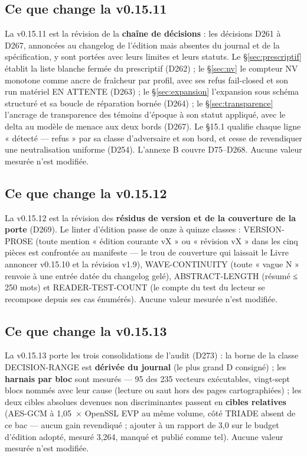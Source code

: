 \subsection{Ce que change la v0.15.11}\label{sec:nouveautes1511}

La v0.15.11 est la révision de la \textbf{chaîne de décisions} : les décisions D261 à D267,
annoncées au changelog de l'édition mais absentes du journal et de la spécification, y sont
portées avec leurs limites et leurs statuts. Le §\ref{sec:prescriptif} établit la liste
blanche fermée du prescriptif (D262) ; le §\ref{sec:nv} le compteur NV monotone comme ancre
de fraîcheur par profil, avec ses refus fail-closed et son run matériel EN ATTENTE (D263) ;
le §\ref{sec:expansion} l'expansion sous schéma structuré et sa boucle de réparation bornée
(D264) ; le §\ref{sec:transparence} l'ancrage de transparence des témoins d'époque à son
statut appliqué, avec le delta au modèle de menace aux deux bords (D267). Le §15.1 qualifie
chaque ligne « détecté — refus » par sa classe d'adversaire et son bord, et cesse de
revendiquer une neutralisation uniforme (D254). L'annexe B couvre D75--D268. Aucune valeur
mesurée n'est modifiée.


\subsection{Ce que change la v0.15.12}\label{sec:nouveautes1512}

La v0.15.12 est la révision des \textbf{résidus de version et de la couverture de la porte}
(D269). Le linter d'édition passe de onze à quinze classes : VERSION-PROSE (toute mention
« édition courante vX » ou « révision vX » dans les cinq pièces est confrontée au manifeste
— le trou de couverture qui laissait le Livre annoncer v0.15.10 et la révision v1.9),
WAVE-CONTINUITY (toute « vague N » renvoie à une entrée datée du changelog gelé),
ABSTRACT-LENGTH (résumé ≤ 250 mots) et READER-TEST-COUNT (le compte du test du lecteur se
recompose depuis ses cas énumérés). Aucune valeur mesurée n'est modifiée.


\subsection{Ce que change la v0.15.13}\label{sec:nouveautes1513}

La v0.15.13 porte les trois consolidations de l'audit (D273) : la borne de la classe
DECISION-RANGE est \textbf{dérivée du journal} (le plus grand D consigné) ; les \textbf{harnais
par bloc} sont mesurés — 95 des 235 vecteurs exécutables, vingt-sept blocs nommés avec leur
cause (lecture ou saut hors des pages cartographiées) ; les deux cibles absolues devenues non
discriminantes passent en \textbf{cibles relatives} (AES-GCM à 1,05~$\times$ OpenSSL EVP au même
volume, côté TRIADE absent de ce bac — aucun gain revendiqué ; ajouter à un rapport de 3,0 sur
le budget d'édition adopté, mesuré 3,264, manqué et publié comme tel). Aucune valeur mesurée
n'est modifiée.


